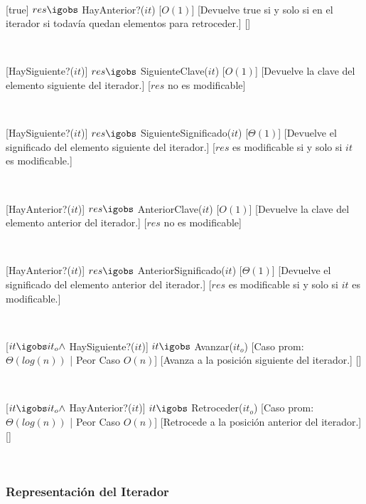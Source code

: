 ~

[true]
{$res \igobs$ HayAnterior?($it$)}
[$O(1)$]
[Devuelve true si y solo si en el iterador si todavía quedan elementos para retroceder.]
[]

~

[HaySiguiente?($it$)]
{$res \igobs$ SiguienteClave($it$)}
[$O(1)$]
[Devuelve la clave del elemento siguiente del iterador.]
[$res$ no es modificable]

~

[HaySiguiente?($it$)]
{$res \igobs$ SiguienteSignificado($it$)}
[$\Theta(1)$]
[Devuelve el significado del elemento siguiente del iterador.]
[$res$ es modificable si y solo si $it$ es modificable.]

~

[HayAnterior?($it$)]
{$res \igobs$ AnteriorClave($it$)}
[$O(1)$]
[Devuelve la clave del elemento anterior del iterador.]
[$res$ no es modificable]

~

[HayAnterior?($it$)]
{$res \igobs$ AnteriorSignificado($it$)}
[$\Theta(1)$]
[Devuelve el significado del elemento anterior del iterador.]
[$res$ es modificable si y solo si $it$ es modificable.]

~

[$it \igobs it_o \land$ HaySiguiente?($it$)]
{$it \igobs$ Avanzar($it_o$)}
[Caso prom: $\Theta(log(n))$ | Peor Caso $O(n)$]
[Avanza a la posición siguiente del iterador.]
[]

~

[$it \igobs it_o \land$ HayAnterior?($it$)]
{$it \igobs$ Retroceder($it_o$)}
[Caso prom: $\Theta(log(n))$ | Peor Caso $O(n)$]
[Retrocede a la posición anterior del iterador.]
[]

~


\subsubsection{Representación del Iterador}

